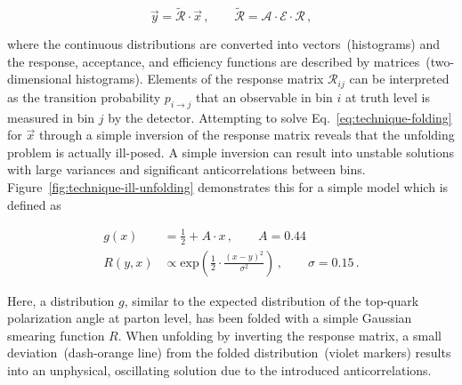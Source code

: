 \begin{equation}
\vec{y} = \widetilde{\mathcal{R}}\cdot\vec{x}\,,\qquad \widetilde{\mathcal{R}}=\mathcal{A}\cdot\mathcal{E}\cdot\mathcal{R}\,, \label{eq:technique-folding}
\end{equation}

where the continuous distributions are converted into vectors~(histograms) and the response, acceptance, and efficiency functions are described by matrices~(two-dimensional histograms). Elements of the response matrix $\mathcal{R}_{ij}$ can be interpreted as the transition probability $p_{i\to j}$ that an observable in bin $i$ at truth level is measured in bin $j$ by the detector. Attempting to solve Eq.~\ref{eq:technique-folding} for $\vec{x}$ through a simple inversion of the response matrix reveals that the unfolding problem is actually ill-posed. A simple inversion can result into unstable solutions with large variances and significant anticorrelations between bins. Figure~\ref{fig:technique-ill-unfolding} demonstrates this for a simple model which is defined as

\begin{subequations}\label{eq:technique-unfolding-test-model}
\begin{align}
g(x)&=\frac{1}{2}+A\cdot x\,,\qquad A=0.44\\
R(y,x)&\propto\mathrm{exp}\left(\frac{1}{2}\cdot\frac{(x-y)^2}{\sigma^2}\right)\,,\qquad \sigma=0.15\,.
\end{align}
\end{subequations}

Here, a distribution $g$, similar to the expected distribution of the top-quark polarization angle at parton level, has been folded with a simple Gaussian smearing function $R$. When unfolding by inverting the response matrix, a small deviation~(dash-orange line) from the folded distribution~(violet markers) results into an unphysical, oscillating solution due to the introduced anticorrelations.

